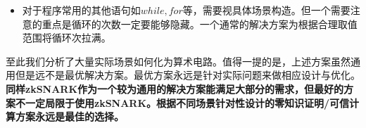 \documentclass[12pt]{article}
\newcommand{\zk}{zkSNARK}
\newcommand{\pp}{$\mathcal{P}$}
\begin{document}
\begin{itemize}
\begin{itemize}
     解决方案：强行还原出$a$的绝对值：引入变量及限制$c=a\cdot a, b\cdot b =c$，$b$在合理范围内（$b \in [0,2^{32})$）。对$b$按照上面方案（判断条件$a=0$）构造证明。
     
       Pinocchio（参考资料[1]）给出了更为巧妙的构造。上述$b=(a!=0)?1:0$的取值可以仅由两个方程决定：
     $$a(1-b)=0, aM-b=0$$
     其中$M$为\pp 提供的新变量。显然，如果$a\neq 0$则$b$一定为1，且$M$能够置为$M=1/a$使上式成立。反之如果$a=0$则$b$也一定为0，$M$可以为任何数。
     
     \item   $$if~~a>0~~then~~\mbox{表达式1}~~else~~\mbox{表达式2}$$
     需要已知限定条件：$a$的绝对值在合理范围内。
     
     注意到我们仍然不能暴露$a$是否大于0。笔者能想到的一个解决方案如下：
     
     （如上）构造$c=a\cdot a, b \cdot b =c$，$b$在合理范围内（$b \in [0,2^{32})$），即$b=|a|$
     
     (如上)构造$c_1= (a!=b)?1:0$，对应$a<0$的情形，$c_2= (-a!=b)?1:0$，对应$a>0$的情形。（注意到此时只有$\pm a=b$两种情形）
     
     注意到，此时还有$a=0$的情形，对应$c_1,c_2$都等于0。我们再引入$c_3= (a=0)?1:0$
     
     构造$d=c_2\mbox{表达式1}+c_1\mbox{表达式2}+c_3\mbox{表达式2}$
  	\end{itemize}
    至此大部分判断函数已经解决。
    \item 对于程序常用的其他语句如$while,for$等，需要视具体场景构造。但一个需要注意的重点是循环的次数一定要能够隐藏。一个通常的解决方案为根据合理取值范围将循环次拉满。
\end{itemize}
至此我们分析了大量实际场景如何化为算术电路。值得一提的是，上述方案虽然通用但是远不是最优解决方案。最优方案永远是针对实际问题来做相应设计与优化。\textbf{同样\zk 作为一个较为通用的解决方案能满足大部分的需求，但最好的方案不一定局限于使用\zk。根据不同场景针对性设计的零知识证明/可信计算方案永远是最佳的选择。}



\newpage
\begin{appendices}
%
\end{appendices}
\end{document}
